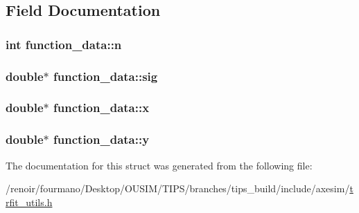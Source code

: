 \subsection{Field Documentation}
\hypertarget{structfunction__data_a0344e578f42804cd3da588a53e722da5}{
\subsubsection[{n}]{\setlength{\rightskip}{0pt plus 5cm}int {\bf function\_\-data::n}}}
\label{structfunction__data_a0344e578f42804cd3da588a53e722da5}
\hypertarget{structfunction__data_a10dfdbe7cbd739c676bc2acdfc32d71e}{
\subsubsection[{sig}]{\setlength{\rightskip}{0pt plus 5cm}double$\ast$ {\bf function\_\-data::sig}}}
\label{structfunction__data_a10dfdbe7cbd739c676bc2acdfc32d71e}
\hypertarget{structfunction__data_abd64c58c97715724b8fea9b82b7bece9}{
\subsubsection[{x}]{\setlength{\rightskip}{0pt plus 5cm}double$\ast$ {\bf function\_\-data::x}}}
\label{structfunction__data_abd64c58c97715724b8fea9b82b7bece9}
\hypertarget{structfunction__data_aa3b2c9fd92e83663cdd62d8188f596d3}{
\subsubsection[{y}]{\setlength{\rightskip}{0pt plus 5cm}double$\ast$ {\bf function\_\-data::y}}}
\label{structfunction__data_aa3b2c9fd92e83663cdd62d8188f596d3}


The documentation for this struct was generated from the following file:\begin{DoxyCompactItemize}
\item 
/renoir/fourmano/Desktop/OUSIM/TIPS/branches/tips\_\-build/include/axesim/\hyperlink{trfit__utils_8h}{trfit\_\-utils.h}\end{DoxyCompactItemize}
